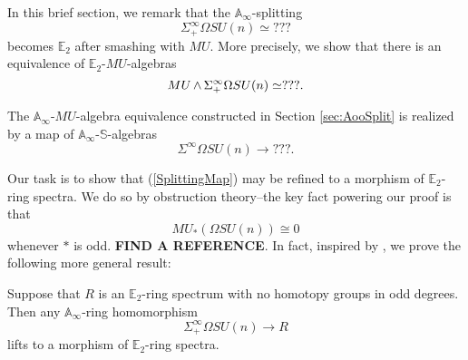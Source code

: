 
In this brief section, we remark that the $\mathbb{A}_\infty$-splitting $$\Sigma^{\infty}_+ \Omega SU(n) \simeq ???$$ becomes $\mathbb{E}_2$ after smashing with $MU$.  More precisely, we show that there is an equivalence of $\mathbb{E}_2$-$MU$-algebras
$$MU \operatorname{\wedge} \Sigma^{\infty}_+ \Omega SU(n) \simeq ???.$$

The $\mathbb{A}_\infty$-$MU$-algebra equivalence constructed in Section \ref{sec:AooSplit} is realized by a map of $\mathbb{A}_\infty$-$\mathbb{S}$-algebras
\begin{equation} \label{SplittingMap}
\Sigma^{\infty} \Omega SU(n) \longrightarrow ???.
\end{equation}

Our task is to show that (\ref{SplittingMap}) may be refined to a morphism of $\mathbb{E}_2$-ring spectra.  We do so by obstruction theory--the key fact powering our proof is that 
$$MU_*\left(\Omega SU(n)\right) \cong 0$$
whenever $*$ is odd.  \textbf{FIND A REFERENCE}.  In fact, inspired by \cite{ChadwickMandell}, we prove the following more general result:

\begin{thm}
Suppose that $R$ is an $\mathbb{E}_2$-ring spectrum with no homotopy groups in odd degrees.  Then any $\mathbb{A}_\infty$-ring homomorphism %
$$\Sigma^{\infty}_+ \Omega SU(n) \rightarrow R$$
lifts to a morphism of $\mathbb{E}_2$-ring spectra.
\end{thm}

